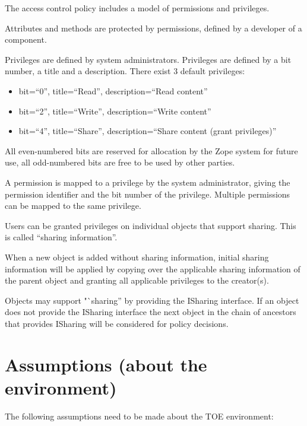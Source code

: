 \documentclass[12pt,english]{scrbook}
\begin{document}
The access control policy includes a model of permissions and privileges.

Attributes and methods are protected by permissions, defined by a developer of
a component.

Privileges are defined by system administrators. Privileges are defined by a
bit number, a title and a description. There exist 3 default privileges:

\begin{itemize}
    \item bit=``0'', title=``Read'', description=``Read content''
    \item bit=``2'', title=``Write'', description=``Write content''
    \item bit=``4'', title=``Share'', description=``Share content (grant privileges)''
\end{itemize}

All even-numbered bits are reserved for allocation by the Zope system for
future use, all odd-numbered bits are free to be used by other parties.

A permission is mapped to a privilege by the system administrator, giving the
permission identifier and the bit number of the privilege. Multiple permissions
can be mapped to the same privilege.

Users can be granted privileges on individual objects that support sharing.
This is called ``sharing information''.

When a new object is added without sharing information, initial sharing
information will be applied by copying over the applicable sharing information
of the parent object and granting all applicable privileges to the creator(s).

Objects may support "`sharing'' by providing the ISharing interface. If an
object does not provide the ISharing interface the next object in the chain of
ancestors that provides ISharing will be considered for policy decisions.




\section{Assumptions (about the environment)}

The following assumptions need to be made about the TOE environment:
\end{document}

